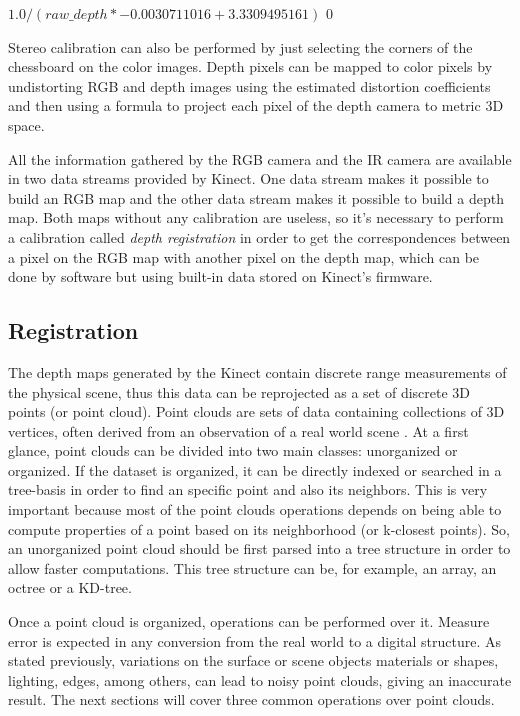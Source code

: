 \documentclass[msc, a4paper, classic, en]{ufbathesis}
\begin{document}
\begin{algorithmic}
\Return $1.0 / (raw\_depth * -0.0030711016 + 3.3309495161)$
\Else \Return $0$
\EndIf
\EndFunction
\end{algorithmic}

Stereo calibration can also be performed by just selecting the corners of the chessboard on the color images. Depth pixels can be mapped to color pixels by undistorting RGB and depth images using the estimated distortion coefficients and then using a formula to project each pixel of the depth camera to metric 3D space.

All the information gathered by the RGB camera and the IR camera are available in two data streams provided by Kinect. One data stream makes it possible to build an RGB map and the other data stream makes it possible to build a depth map. Both maps without any calibration are useless, so it's necessary to perform a calibration called \textit{depth registration} in order to get the correspondences between a pixel on the RGB map with another pixel on the depth map, which can be done by software but using built-in data stored on Kinect's firmware.

\subsection{Registration}

The depth maps generated by the Kinect contain discrete range measurements of the physical scene, thus this data can be reprojected as a set of discrete 3D points (or point cloud). Point clouds are sets of data containing collections of 3D vertices, often derived from an observation of a real world scene \cite{price2012}. At a first glance, point clouds can be divided into two main classes: unorganized or organized. If the dataset is organized, it can be directly indexed or searched in a tree-basis in order to find an specific point and also its neighbors. This is very important because most of the point clouds operations depends on being able to compute properties of a point based on its neighborhood (or k-closest points). So, an unorganized point cloud should be first parsed into a tree structure in order to allow faster computations. This tree structure can be, for example, an array, an octree or a KD-tree.

Once a point cloud is organized, operations can be performed over it. Measure error is expected in any conversion from the real world to a digital structure. As stated previously, variations on the surface or scene objects materials or shapes, lighting, edges, among others, can lead to noisy point clouds, giving an inaccurate result. The next sections will cover three common operations over point clouds.
\end{document}
